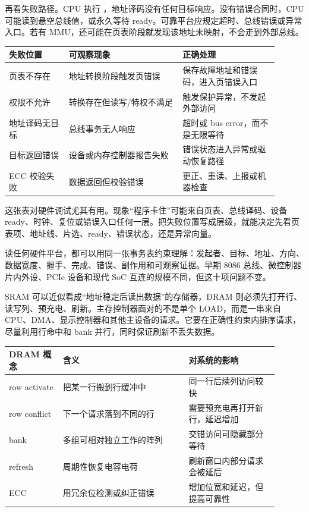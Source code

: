 再看失败路径。CPU 执行 ，地址译码没有任何目标响应。没有错误合同时，CPU 可能读到悬空总线值，或永久等待 ready。可靠平台应规定超时、总线错误或异常入口。若有 MMU，还可能在页表阶段就发现该地址未映射，不会走到外部总线。

\begin{longtable}{L{0.2\linewidth}L{0.38\linewidth}L{0.32\linewidth}}
\toprule
失败位置 & 可观察现象 & 正确处理 \\
\midrule
页表不存在 & 地址转换阶段触发页错误 & 保存故障地址和错误码，进入页错误入口 \\
权限不允许 & 转换存在但读写/特权不满足 & 触发保护异常，不发起外部访问 \\
地址译码无目标 & 总线事务无人响应 & 超时或 bus error，而不是无限等待 \\
目标返回错误 & 设备或内存控制器报告失败 & 错误状态进入异常或驱动恢复路径 \\
ECC 校验失败 & 数据返回但校验错误 & 更正、重读、上报或机器检查 \\
\bottomrule
\end{longtable}

这张表对硬件调试尤其有用。现象“程序卡住”可能来自页表、总线译码、设备 ready、时钟、复位或错误入口任何一层。把失败位置写成层级，就能决定先看页表项、地址线、片选、ready、错误状态，还是异常向量。

\begin{classicnote}
读任何硬件平台，都可以用同一张事务表约束理解：发起者、目标、地址、方向、数据宽度、握手、完成、错误、副作用和可观察证据。早期 8086 总线、微控制器片内外设、PCIe 设备和现代 SoC 互连的规模不同，但这十项问题不变。
\end{classicnote}

SRAM 可以近似看成“地址稳定后读出数据”的存储器，DRAM 则必须先打开行、读写列、预充电、刷新。主存控制器面对的不是单个 LOAD，而是一串来自 CPU、DMA、显示控制器和其他主设备的请求。它要在正确性约束内排序请求，尽量利用行命中和 bank 并行，同时保证刷新不丢失数据。

\begin{longtable}{L{0.18\linewidth}L{0.42\linewidth}L{0.3\linewidth}}
\toprule
DRAM 概念 & 含义 & 对系统的影响 \\
\midrule
row activate & 把某一行搬到行缓冲中 & 同一行后续列访问较快 \\
row conflict & 下一个请求落到不同的行 & 需要预充电再打开新行，延迟增加 \\
bank & 多组可相对独立工作的阵列 & 交错访问可隐藏部分等待 \\
refresh & 周期性恢复电容电荷 & 刷新窗口内部分请求会被延后 \\
ECC & 用冗余位检测或纠正错误 & 增加位宽和延迟，但提高可靠性 \\
\bottomrule
\end{longtable}

